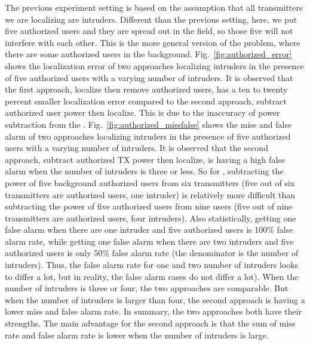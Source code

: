 The previous experiment setting is based on the assumption that all transmitters we are localizing are intruders.
Different than the previous setting, here, we put five authorized users and they are spread out in the field, so those five will not interfere with each other.
This is the more general version of the \mtl problem, where there are some authorized users in the background.
Fig.~\ref{fig:authorized_error} shows the localization error of two approaches localizing intruders in the presence of five authorized users with a varying number of intruders.
It is observed that the first approach, localize then remove authorized users, has a ten to twenty percent smaller localization error compared to the second approach, subtract authorized user power then localize.
This is due to the inaccuracy of power subtraction from the \subtract.
Fig.~\ref{fig:authorized_missfalse} shows the miss and false alarm of two approaches localizing intruders in the presence of five authorized users with a varying number of intruders.
It is observed that the second approach, subtract authorized TX power then localize, is having a high false alarm when the number of intruders is three or less.
So for \subtract, subtracting the power of five background authorized users from six transmitters (five out of six transmitters are authorized users, one intruder) is relatively more difficult than subtracting the power of five authorized users from nine users (five out of nine transmitters are authorized users, four intruders). 
Also statistically, getting one false alarm when there are one intruder and five authorized users is 100\% false alarm rate, while getting one false alarm when there are two intruders and five authorized users is only 50\% false alarm rate (the denominator is the number of intruders).
Thus, the false alarm rate for one and two number of intruders looks to differ a lot, but in reality, the false alarm cases do not differ a lot).
When the number of intruders is three or four, the two approaches are comparable. But when the number of intruders is larger than four, the second approach is having a lower miss and false alarm rate.
In summary, the two approaches both have their strengths.
The main advantage for the second approach is that the sum of miss rate and false alarm rate is lower when the number of intruders is large.

